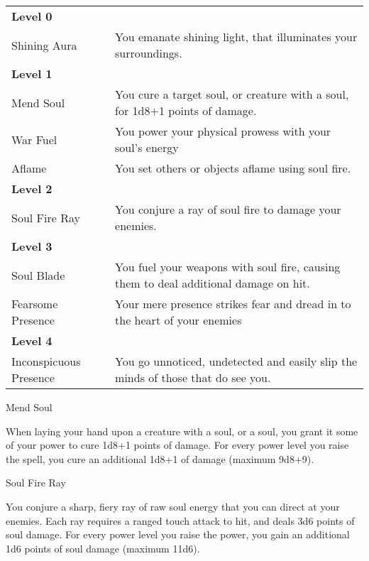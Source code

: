 \begin{table*}[!htb]
  \caption{Soul Powers}
  \begin{tabular}{p{4cm} p{11cm}}
    \textbf{Level 0} & \nobreak \\
    Shining Aura     & You emanate shining light, that illuminates your surroundings. \\
    \textbf{Level 1} & \nobreak \\
    Mend Soul        & You cure a target soul, or creature with a soul, for 1d8+1 points of damage. \\
    War Fuel         & You power your physical prowess with your soul's energy \\
    Aflame           & You set others or objects aflame using soul fire. \\
    \textbf{Level 2} & \nobreak \\
    Soul Fire Ray    & You conjure a ray of soul fire to damage your enemies. \\
    \textbf{Level 3} & \nobreak \\
    Soul Blade       & You fuel your weapons with soul fire, causing them to deal additional damage on hit. \\
    Fearsome Presence& Your mere presence strikes fear and dread in to the heart of your enemies \\
    \textbf{Level 4} & \nobreak \\
    Inconspicuous Presence & You go unnoticed, undetected and easily slip the minds of those that do see you. \\
  \end{tabular}
\end{table*}

\begin{soulpower}{Mend Soul}
  \rangetouch
  \instantaneous

  When laying your hand upon a creature with a soul, or a soul, you grant it
  some of your power to cure 1d8+1 points of damage. For every power level you
  raise the spell, you cure an additional 1d8+1 of damage (maximum 9d8+9).
\end{soulpower}

\begin{soulpower}{Soul Fire Ray}
  \rangeclose
  \instantaneous

  You conjure a sharp, fiery ray of raw soul energy that you can direct at
  your enemies. Each ray requires a ranged touch attack to hit, and deals 3d6
  points of soul damage. For every power level you raise the power, you gain
  an additional 1d6 points of soul damage (maximum 11d6).
\end{soulpower}

